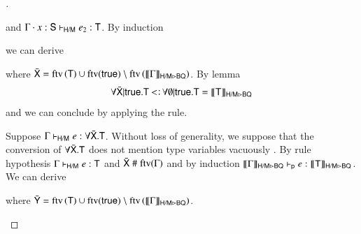 \documentclass{report}
\begin{document}
\begin{proof}[]
\begin{indcase}{\mllet}
      and $\Gamma\cdot x:\type{S}\entailsml e_2:\type{T}$. By induction
      we can derive
      \begin{mathpar}
      \end{mathpar}
      where $\bar{\type{X}}=\ftv\lrp{\type{T}}\cup\ftv(\true)\setminus\ftv\lrp{\mltobq{\Gamma}}$.
      By lemma 
      \begin{displaymath}
        \forall\bar{\type{X}}|\true.\type{T}\subtype
        \forall\emptyset|\true.\type{T}=\mltobq{\type{T}}
      \end{displaymath}
      and we can conclude by applying the \decsub rule.
    \end{indcase}
    \begin{indcase}{\mlgen}
      Suppose $\Gamma\entailsml e:\forall\bar{\type{X}}.\type{T}$. Without loss of generality,
      we suppose that the conversion of $\forall\bar{\type{X}}.\type{T}$ does not mention
      type variables vacuously . By rule hypothesis
      $\Gamma\entailsml e:\type{T}$ and $\bar{\type{X}}\pound\ftv(\Gamma)$ and by induction
      $\mltobq{\Gamma}\entailsp e:\mltobq{\type{T}}$. We can derive
      \begin{mathpar}
      \end{mathpar}
      where $\bar{\type{Y}}=\ftv\lrp{\type{T}}\cup\ftv(\true)\setminus\ftv\lrp{\mltobq{\Gamma}}$.

\end{indcase}
\end{proof}
\end{document}
